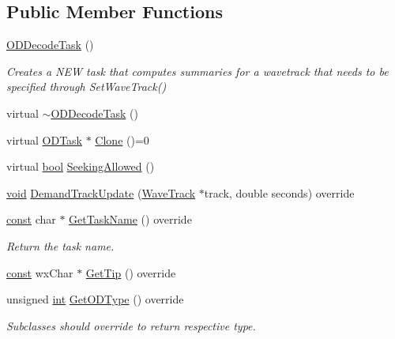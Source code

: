 \subsection*{Public Member Functions}
\begin{DoxyCompactItemize}
\item 
\hyperlink{class_o_d_decode_task_a20812a1863dcf92d99d7377b71df88ac}{O\+D\+Decode\+Task} ()
\begin{DoxyCompactList}\small\item\em Creates a N\+EW task that computes summaries for a wavetrack that needs to be specified through Set\+Wave\+Track() \end{DoxyCompactList}\item 
virtual \hyperlink{class_o_d_decode_task_a809c8ab3a8ab68913f7ff81ae899e118}{$\sim$\+O\+D\+Decode\+Task} ()
\item 
virtual \hyperlink{class_o_d_task}{O\+D\+Task} $\ast$ \hyperlink{class_o_d_decode_task_aaf5e43da3670a83472004cdd814e0e91}{Clone} ()=0
\item 
virtual \hyperlink{mac_2config_2i386_2lib-src_2libsoxr_2soxr-config_8h_abb452686968e48b67397da5f97445f5b}{bool} \hyperlink{class_o_d_decode_task_aa267d1da349dec91013a660b92d0eae1}{Seeking\+Allowed} ()
\item 
\hyperlink{sound_8c_ae35f5844602719cf66324f4de2a658b3}{void} \hyperlink{class_o_d_decode_task_ac92bb5ae7050381450df2ca763c3b355}{Demand\+Track\+Update} (\hyperlink{class_wave_track}{Wave\+Track} $\ast$track, double seconds) override
\item 
\hyperlink{getopt1_8c_a2c212835823e3c54a8ab6d95c652660e}{const} char $\ast$ \hyperlink{class_o_d_decode_task_a5f2034392c64c7c9ce21b41a7b1762c2}{Get\+Task\+Name} () override
\begin{DoxyCompactList}\small\item\em Return the task name. \end{DoxyCompactList}\item 
\hyperlink{getopt1_8c_a2c212835823e3c54a8ab6d95c652660e}{const} wx\+Char $\ast$ \hyperlink{class_o_d_decode_task_a4538ad3af764a58b68c4919be3ddad12}{Get\+Tip} () override
\item 
unsigned \hyperlink{xmltok_8h_a5a0d4a5641ce434f1d23533f2b2e6653}{int} \hyperlink{class_o_d_decode_task_a991951e399aaa8f616a24a3ab3ea650b}{Get\+O\+D\+Type} () override
\begin{DoxyCompactList}\small\item\em Subclasses should override to return respective type. \end{DoxyCompactList}\item 

\end{DoxyCompactItemize}
